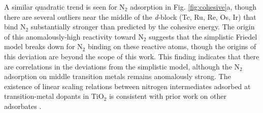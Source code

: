 A similar quadratic trend is seen for N$_2$ adsorption in Fig. \ref{fig:cohesive}a, though there are several outliers near the middle of the \textit{d}-block (Tc, Ru, Re, Os, Ir) that bind N$_2$ substantially stronger than predicted by the cohesive energy. The origin of this anomalously-high reactivity toward N$_2$ suggests that the simplistic Friedel model breaks down for N$_2$ binding on these reactive atoms, though the origins of this deviation are beyond the scope of this work. 
This finding indicates that there are correlations in the deviations from the simplistic model, although the N$_2$ adsorption on middle transition metals remains anomalously strong. The existence of linear scaling relations between nitrogen intermediates adsorbed at transition-metal dopants in TiO$_2$ is consistent with prior work on other adsorbates \cite{Xu_2015, Garc_a_Mota_2011, Yao_2017}.%





